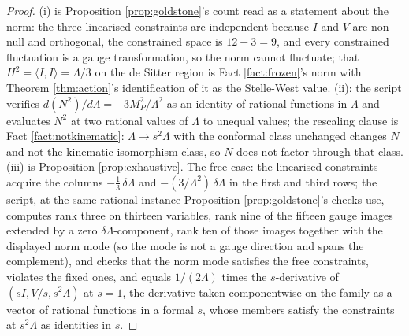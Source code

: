 \documentclass[11pt]{article}
\theoremstyle{definition}
\newcommand{\ip}[2]{\langle #1, #2\rangle}
\begin{document}
\begin{proof}
(i) is Proposition \ref{prop:goldstone}'s count read as a statement about the norm: the three linearised constraints are independent because $I$ and $V$ are non-null and orthogonal, the constrained space is $12 - 3 = 9$, and every constrained fluctuation is a gauge transformation, so the norm cannot fluctuate; that $H^2 = \ip{I}{I} = \Lambda/3$ on the de Sitter region is Fact \ref{fact:frozen}'s norm with Theorem \ref{thm:action}'s identification of it as the Stelle-West value. (ii): the script verifies $d(N^2)/d\Lambda = -3M_P^2/\Lambda^2$ as an identity of rational functions in $\Lambda$ and evaluates $N^2$ at two rational values of $\Lambda$ to unequal values; the rescaling clause is Fact \ref{fact:notkinematic}: $\Lambda \to s^2\Lambda$ with the conformal class unchanged changes $N$ and not the kinematic isomorphism class, so $N$ does not factor through that class. (iii) is Proposition \ref{prop:exhaustive}. The free case: the linearised constraints acquire the columns $-\tfrac13\,\delta\Lambda$ and $-(3/\Lambda^2)\,\delta\Lambda$ in the first and third rows; the script, at the same rational instance Proposition \ref{prop:goldstone}'s checks use, computes rank three on thirteen variables, rank nine of the fifteen gauge images extended by a zero $\delta\Lambda$-component, rank ten of those images together with the displayed norm mode (so the mode is not a gauge direction and spans the complement), and checks that the norm mode satisfies the free constraints, violates the fixed ones, and equals $1/(2\Lambda)$ times the $s$-derivative of $(sI, V/s, s^2\Lambda)$ at $s = 1$, the derivative taken componentwise on the family as a vector of rational functions in a formal $s$, whose members satisfy the constraints at $s^2\Lambda$ as identities in $s$.
\end{proof}
\end{document}
